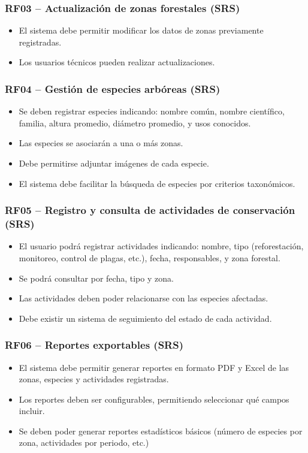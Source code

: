 \subsubsection{RF03 – Actualización de zonas forestales (SRS)}
\begin{itemize}
\item El sistema debe permitir modificar los datos de zonas previamente registradas.
\item Los usuarios técnicos pueden realizar actualizaciones.
\end{itemize}

\subsubsection{RF04 – Gestión de especies arbóreas (SRS)}
\begin{itemize}
\item Se deben registrar especies indicando: nombre común, nombre científico, familia, altura promedio, diámetro promedio, y usos conocidos.
\item Las especies se asociarán a una o más zonas.
\item Debe permitirse adjuntar imágenes de cada especie.
\item El sistema debe facilitar la búsqueda de especies por criterios taxonómicos.
\end{itemize}

\subsubsection{RF05 – Registro y consulta de actividades de conservación (SRS)}
\begin{itemize}
\item El usuario podrá registrar actividades indicando: nombre, tipo (reforestación, monitoreo, control de plagas, etc.), fecha, responsables, y zona forestal.
\item Se podrá consultar por fecha, tipo y zona.
\item Las actividades deben poder relacionarse con las especies afectadas.
\item Debe existir un sistema de seguimiento del estado de cada actividad.
\end{itemize}

\subsubsection{RF06 – Reportes exportables (SRS)}
\begin{itemize}
\item El sistema debe permitir generar reportes en formato PDF y Excel de las zonas, especies y actividades registradas.
\item Los reportes deben ser configurables, permitiendo seleccionar qué campos incluir.
\item Se deben poder generar reportes estadísticos básicos (número de especies por zona, actividades por periodo, etc.)
\end{itemize}

